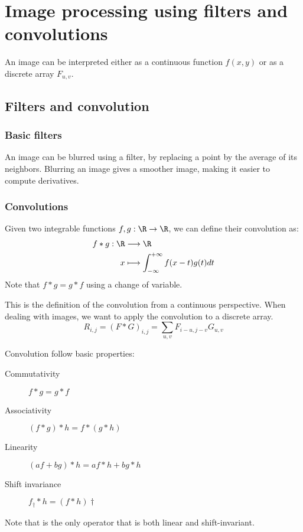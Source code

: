 \section{Image processing using filters and convolutions}
An image can be interpreted either as a continuous function $f(x, y)$ or as a discrete array $F_{u,v}$.

\subsection{Filters and convolution}
\subsubsection{Basic filters}
An image can be blurred using a filter, by replacing a point by the average of its neighbors. Blurring an image gives a smoother image, making it easier to compute derivatives. 

\subsubsection{Convolutions}
Given two integrable functions $f, g:\R\to\R$, we can define their convolution as:
\begin{align*}
    f*g: \R&\longrightarrow \R\\
    x&\longmapsto\int_{-\infty}^{+\infty}f(x-t)g(t)dt
\end{align*}
Note that $f*g=g*f$ using a change of variable.

This is the definition of the convolution from a continuous perspective. When dealing with images, we want to apply the convolution to a discrete array.
\begin{equation*}
    R_{i,j} = (F*G)_{i,j} = \sum_{u,v} F_{i-u, j-v}G_{u,v}
\end{equation*}


Convolution follow basic properties:
\begin{description}
    \item[Commutativity] $f*g=g*f$
    \item[Associativity] $(f*g)*h = f*(g*h)$
    \item[Linearity] $(af+bg)*h = af*h + bg*h$
    \item[Shift invariance] $f_\dagger * h = (f*h)\dagger$
\end{description}
Note that is the only operator that is both linear and shift-invariant.

